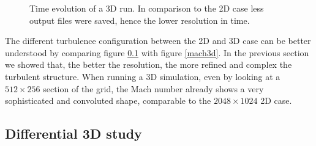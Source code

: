{\begin{figure}[t!]
	\caption{Time evolution of a 3D run. In comparison to the 2D case less output files were saved, hence the lower resolution in time.}
	\label{3dsingle}
\end{figure}
The different turbulence configuration between the 2D and 3D case can be better understood by comparing figure \ref{} with figure \ref{mach3d}. In the previous section we showed that, the better the resolution, the more refined and complex the turbulent structure. When running a 3D simulation, even by looking at a $512 \times 256$ section of the grid, the Mach number already shows a very sophisticated and convoluted shape, comparable to the $2048 \times 1024$ 2D case.
}
\subsection{Differential 3D study}
